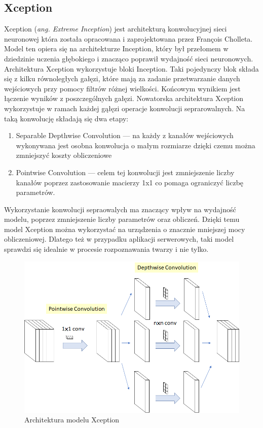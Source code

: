 \subsection{Xception }
Xception (\emph{ang. Extreme Inception}) \cite{xception} jest architekturą konwolucyjnej sieci neuronowej która została opracowana i zaprojektowana przez François Cholleta. Model ten opiera się na architekturze Inception, który był przełomem w dziedzinie uczenia głębokiego i znacząco poprawił wydajność sieci neuronowych. \\
Architektura Xception wykorzystuje bloki Inception. Taki pojedynczy blok składa się z kilku równoległych gałęzi, które mają za zadanie przetwarzanie danych wejściowych przy pomocy filtrów różnej wielkości. Końcowym wynikiem jest łączenie wyników z poszczególnych gałęzi. 
Nowatorska architektura Xception wykorzystuje w ramach każdej gąłęzi operacje konwolucji seprarowalnych. Na taką konwolucję składają się dwa etapy:
\begin{enumerate}
\item Separable Depthwise Convolution --- na każdy z kanałów wejściowych wykonywana jest osobna konwolucja o małym rozmiarze dzięki czemu można zmniejszyć koszty obliczeniowe
\item Pointwise Convolution --- celem tej konwolucji jest zmniejszenie liczby kanałów poprzez zastosowanie macierzy 1x1 co pomaga ograniczyć liczbę parametrów.
\end{enumerate}

Wykorzystanie konwolucji sepraowalych ma znaczący wpływ na wydajność modelu, poprzez zmniejszenie liczby parametrów oraz obliczeń. Dzięki temu model Xception można wykorzystać na urządzenia o znacznie mniejszej mocy obliczeniowej. Dlatego też w przypadku aplikacji serwerowych, taki model sprawdzi się idealnie w procesie rozpoznawania twarzy i nie tylko.

\begin{figure}[ht]
	\centering
		\includegraphics[width=0.6\linewidth]{imgs/xception-arch.png}
	\caption{Architektura modelu Xception}
	\label{fig:xception-architektura}
\end{figure}

